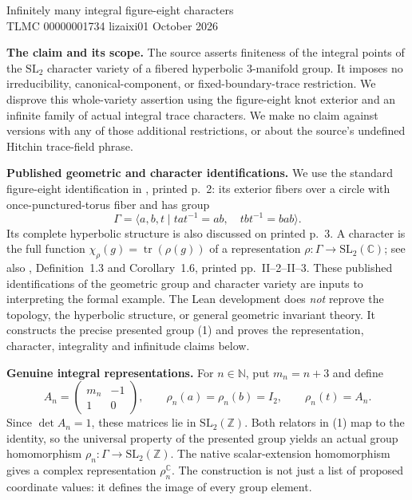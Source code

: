 \documentclass[10pt,a4paper]{article}
\begin{document}
\begin{center}
{\Large Infinitely many integral figure-eight characters}\\[4pt]
TLMC 00000001734 \quad lizaixi01  October 2026
\end{center}

\textbf{The claim and its scope.}
The source asserts finiteness of the integral points of the $\mathrm{SL}_2$
character variety of a fibered hyperbolic $3$-manifold group. It imposes no
irreducibility, canonical-component, or fixed-boundary-trace restriction.
We disprove this whole-variety assertion using the figure-eight knot exterior
and an infinite family of actual integral trace characters. We make no claim
against versions with any of those additional restrictions, or about the
source's undefined Hitchin trace-field phrase.

\textbf{Published geometric and character identifications.}
We use the standard figure-eight identification in \cite{hmp}, printed p.~2:
its exterior fibers over a circle with once-punctured-torus fiber and has group
\[
 \Gamma=\langle a,b,t\mid tat^{-1}=ab,\quad tbt^{-1}=bab\rangle.
 \tag{1}
\]
Its complete hyperbolic structure is also discussed on printed p.~3.
A character is the full function $\chi_\rho(g)=\operatorname{tr}(\rho(g))$
of a representation $\rho:\Gamma\to\mathrm{SL}_2(\mathbb C)$; see also
\cite{porti}, Definition~1.3 and Corollary~1.6, printed pp.~II--2--II--3.
These published identifications of the geometric group and character variety
are inputs to interpreting the formal example. The Lean development does
\emph{not} reprove the topology, the hyperbolic structure, or general geometric
invariant theory. It constructs the precise presented group (1) and proves
the representation, character, integrality and infinitude claims below.

\textbf{Genuine integral representations.}
For $n\in\mathbb N$, put $m_n=n+3$ and define
\[
 A_n=\begin{pmatrix}m_n&-1\\1&0\end{pmatrix},\qquad
 \rho_n(a)=\rho_n(b)=I_2,\qquad \rho_n(t)=A_n.
 \tag{2}
\]
Since $\det A_n=1$, these matrices lie in $\mathrm{SL}_2(\mathbb Z)$.
Both relators in (1) map to the identity, so the universal property of the
presented group yields an actual group homomorphism
$\rho_n:\Gamma\to\mathrm{SL}_2(\mathbb Z)$.
The native scalar-extension homomorphism gives a complex representation
$\rho_n^{\mathbb C}$. The construction is not just a list of proposed
coordinate values: it defines the image of every group element.
\end{document}
